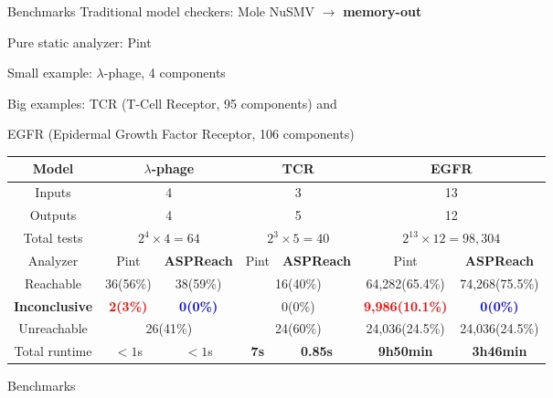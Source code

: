 \documentclass[8pt]{beamer}
\newcommand{\highlight}[1]{\textcolor{blue!50}{\textbf{#1}}}
\begin{document}
\begin{frame}{Benchmarks}
Traditional model checkers: Mole NuSMV $\to$ \highlight{memory-out}

Pure static analyzer: Pint \cite{folschette2015}

Small example: $\lambda$-phage, 4 components

Big examples: TCR (T-Cell Receptor, 95 components) and

EGFR (Epidermal Growth Factor Receptor, 106 components)

\small
\begin{table}[t]
    \centering
    \begin{tabular}{|c|c|c|c|c|c|c|}
    \hline
  	Model	&\multicolumn{2}{c|}{$\lambda$-phage}	&	  \multicolumn{2}{c|}{TCR} & \multicolumn{2}{c|}{EGFR}  \\
    \hline
    Inputs&\multicolumn{2}{c|}{4}	&	  \multicolumn{2}{c|}{3} & \multicolumn{2}{c|}{13}\\
    \hline
    Outputs&\multicolumn{2}{c|}{4} &	  \multicolumn{2}{c|}{5} & \multicolumn{2}{c|}{12} \\
    \hline
    Total tests&\multicolumn{2}{c|}{$2^4\times 4=64$} & \multicolumn{2}{c|}{$2^3\times 5=40$} & \multicolumn{2}{c|}{$2^{13}\times 12=98,304$}\\
    \hline
    Analyzer  &  Pint       &\textbf{ASPReach}    &  Pint       &\textbf{ASPReach}   &  Pint       &\textbf{ASPReach}             \\
    \hline
    Reachable    & 36(56\%)& 38(59\%)   &  \multicolumn{2}{c|}{16(40\%)}  & 64,282(65.4\%)&74,268(75.5\%)\\
    \hline
    \textbf{Inconclusive} & \textcolor{red}{\textbf{2(3\%)}}&\textcolor{blue}{\textbf{0(0\%)}}& \multicolumn{2}{c|}{0(0\%)}    &\textcolor{red}{\textbf{9,986(10.1\%)}}&\textcolor{blue}{\textbf{0(0\%)}}  \\
    \hline
    Unreachable     &  \multicolumn{2}{c|}{26(41\%)} &  \multicolumn{2}{c|}{24(60\%)} &24,036(24.5\%)&24,036(24.5\%)\\
    \hline
    Total runtime &  $<1$s       &  $<1$s &  \textbf{7s}       &  \textbf{0.85s}        & \textbf{9h50min}              & \textbf{3h46min}      \\
    \hline
    \end{tabular}
\end{table}
\end{frame}

\begin{frame}{Benchmarks}


\end{frame}
\end{document}
